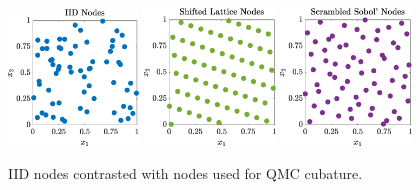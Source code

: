 \documentclass[11pt]{NSFamsart}
\begin{document}
\begin{figure}[h] %
	\centering
	\includegraphics[width = 0.31\textwidth]{ProgramsImages/IIDPoints.eps} \quad
	\includegraphics[width = 0.31\textwidth]{ProgramsImages/ShiftedLatticePoints.eps}  \quad
	\includegraphics[width = 0.31\textwidth]{ProgramsImages/SSobolPoints.eps} 
	
	\caption{IID nodes contrasted with nodes used for QMC cubature.\label{PtsFig}}
\end{figure}
\end{document}
